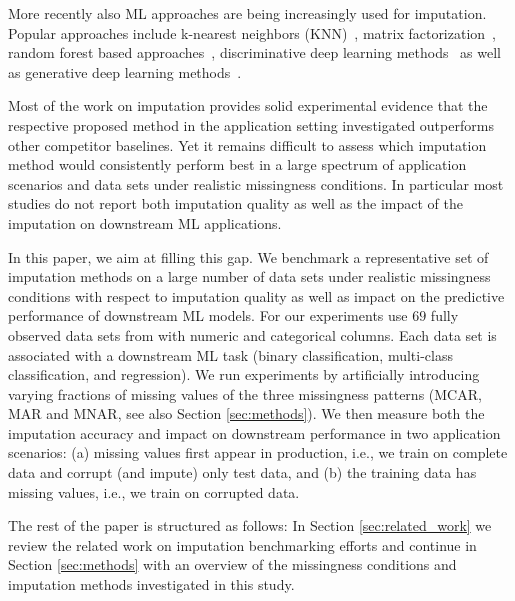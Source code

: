More recently also ML approaches are being increasingly used for imputation. Popular approaches include k-nearest neighbors (KNN)~\citep{Batista2003}, matrix factorization~\citep{Troyanskaya2001,Koren2009,Mazumder2010}, random forest based approaches~\citep{Stekhoven2012}, discriminative deep learning methods~\citep{Biessmann2018a} as well as generative deep learning methods~\citep{HIVAE,GAIN}.

%

Most of the work on imputation provides solid experimental evidence that the respective proposed method in the application setting investigated outperforms other competitor baselines. Yet it remains difficult to assess which imputation method would consistently perform best in a large spectrum of application scenarios and data sets under realistic missingness conditions. In particular most studies do not report both imputation quality as well as the impact of the imputation on downstream ML applications.

In this paper, we aim at filling this gap. We benchmark a representative set of imputation methods on a large number of data sets under realistic missingness conditions with respect to imputation quality as well as impact on the predictive performance of downstream ML models. For our experiments use $69$ fully observed data sets from  \citep{OpenML2013} with numeric and categorical columns. Each data set is associated with a downstream ML task (binary classification, multi-class classification, and regression). We run experiments by artificially introducing varying fractions of missing values of the three missingness patterns (MCAR, MAR and MNAR, see also Section \ref{sec:methods}). We then measure both the imputation accuracy and impact on downstream performance in two application scenarios: (a) missing values first appear in production, i.e., we train on complete data and corrupt (and impute) only test data, and (b) the training data has missing values, i.e., we train on corrupted data.

The rest of the paper is structured as follows: In Section \ref{sec:related_work} we review the related work on imputation benchmarking efforts and continue in Section \ref{sec:methods} with an overview of the missingness conditions and imputation methods investigated in this study.
